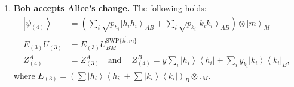 \documentclass{theoretics}
\begin{document}
\begin{enumerate}
\begin{proof}
          which is also block diagonal with respect to $\mathcal{H}\oplus \mathcal{H}^{\perp}$ and has only term I in the first block. Consequently,
          only on these will $U_{(2)}$ have a non-trivial action (as $U_{(2)}$ is of the form $\begin{bmatrix} U &0\\ 0 &\mathbb{I}_{\mathcal{H}^\perp} \end{bmatrix}$ wrt $\mathcal{H}\oplus\mathcal{H}^\perp$). Let us first evaluate
          the non-$\mathcal{H}$ part where we only need to apply the projector.
          The result after separating equations where possible is
          \begin{align*}
            \sum x_{h_{i}}\left|h_{i}\right\rangle \left\langle h_{i}\right|\otimes\left(\mathbb{I}-\left|h_{i}\right\rangle \left\langle h_{i}\right|\right)  \ge0, \text{ and }
            \sum(x_{k_{i}}-x_{k_{i}})\left|k_{i}\right\rangle \left\langle k_{i}\right|\otimes\mathbb{I}  \ge0,
          \end{align*}
          which imply
          $
            x_{h_{i}}\ge0.
          $
          The non-trivial part yields
          \begin{displaymath}
            \sum x_{h_{i}}\left|h_{i}h_{i}\right\rangle \left\langle h_{i}h_{i}\right|\ge\sum x_{g_{i}}E_{(2)}U_{(2)}\left|g_{i}g_{i}\right\rangle \left\langle g_{i}g_{i}\right|U_{(2)}^{\dagger}E_{(2)}
          \end{displaymath}
          completing the proof.
        \end{proof}
  \item \textbf{Bob accepts Alice's change.} The following holds:
        \begin{align*}
          \left|\psi_{(4)}\right\rangle & =\left(\sum_{i}\sqrt{p_{h_{i}}}\left|h_{i}h_{i}\right\rangle _{AB}+\sum_{i}\sqrt{p_{k_{i}}}\left|k_{i}k_{i}\right\rangle _{AB}\right)\otimes\left|m\right\rangle _{M} \\
          E_{(3)}U_{(3)}                & =E_{(3)}U_{BM}^{\text{SWP}\{\vec{h},m\}}                                                                                                                              \\
          Z_{(4)}^{A}                   & =Z_{(3)}^{A} \ \ \ \text{ and }\ \ \ \
          Z_{(4)}^{B}  =y\sum_{i}\left|h_{i}\right\rangle \left\langle h_{i}\right|+\sum_{i}y_{k_{i}}\left|k_{i}\right\rangle \left\langle k_{i}\right|_{B},
        \end{align*}
        where $E_{(3)}=\left(\sum\left|h_{i}\right\rangle \left\langle h_{i}\right|+\sum\left|k_{i}\right\rangle \left\langle k_{i}\right|\right)_{B}\otimes\mathbb{I}_{M}$.

\end{enumerate}
\end{document}
